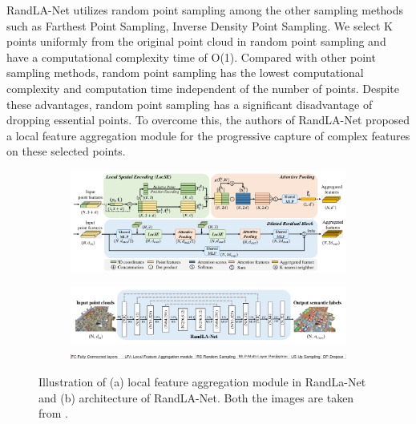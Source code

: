 RandLA-Net utilizes random point sampling among the other sampling methods such as Farthest Point Sampling, Inverse Density Point Sampling.
We select K points uniformly from the original point cloud in random point sampling and have a computational complexity time of O(1).
Compared with other point sampling methods, random point sampling has the lowest computational complexity and computation time independent of the number of points.
Despite these advantages, random point sampling has a significant disadvantage of dropping essential points.
To overcome this, the authors of RandLA-Net proposed a local feature aggregation module for the progressive capture of complex features on these selected points.
\begin{figure}
    \centering
    \begin{subfigure}{0.45\textwidth}
        \centering
            \includegraphics[scale=0.4, angle=90]{images/localfeatueaggregation-randlanet.png}
            \caption{}
            \label{fig:randlanetlfa}       
    \end{subfigure}
    \begin{subfigure}{0.45\textwidth}
        \centering
            \includegraphics[scale=0.55, angle=90]{images/randlanet.png}
            \includegraphics[scale=0.55, angle=90]{images/archi_expl.png}
            \caption{}
            \label{fig:networkarchitecture}
    \end{subfigure}
    \caption{Illustration of (a) local feature aggregation module in RandLa-Net and (b) architecture of RandLA-Net. Both the images are taken from \cite{Hu_2020_CVPR_Randla}.}
\end{figure}

